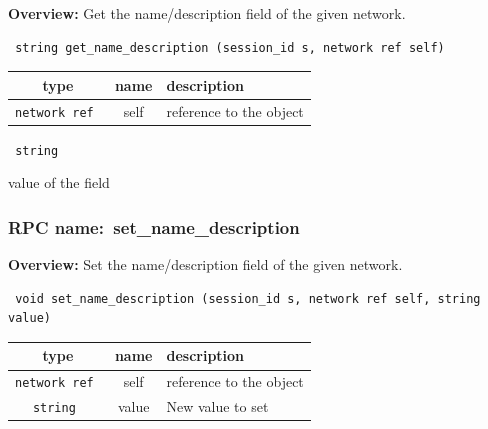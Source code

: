 {\bf Overview:} 
Get the name/description field of the given network.

\begin{verbatim} string get_name_description (session_id s, network ref self)\end{verbatim}



 
\vspace{0.3cm}
\begin{tabular}{|c|c|p{7cm}|}
 \hline
{\bf type} & {\bf name} & {\bf description} \\ \hline
{\tt network ref } & self & reference to the object \\ \hline 

\end{tabular}

\vspace{0.3cm}

{\tt 
string
}


value of the field
\vspace{0.3cm}
\vspace{0.3cm}
\vspace{0.3cm}
\subsubsection{RPC name:~set\_name\_description}

{\bf Overview:} 
Set the name/description field of the given network.

\begin{verbatim} void set_name_description (session_id s, network ref self, string value)\end{verbatim}



 
\vspace{0.3cm}
\begin{tabular}{|c|c|p{7cm}|}
 \hline
{\bf type} & {\bf name} & {\bf description} \\ \hline
{\tt network ref } & self & reference to the object \\ \hline 

{\tt string } & value & New value to set \\ \hline 

\end{tabular}

\vspace{0.3cm}


